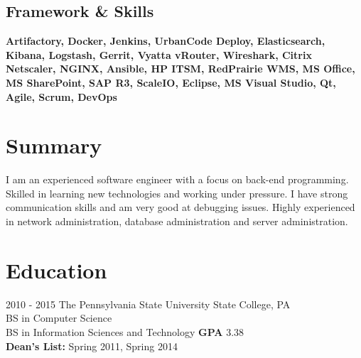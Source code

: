 \documentclass[]{friggeri-cv}
\begin{document}
\begin{aside}
  \section{Framework \& Skills}
    \textbf{Artifactory, Docker, Jenkins, UrbanCode Deploy, Elasticsearch, Kibana, Logstash,
    Gerrit, Vyatta vRouter, Wireshark, Citrix Netscaler, NGINX, Ansible, HP ITSM, RedPrairie WMS,
    MS Office, MS SharePoint, SAP R3, ScaleIO, Eclipse, MS Visual Studio, Qt, Agile, Scrum, DevOps}
\end{aside}

\section{Summary}
  {I am an experienced software engineer with a focus on back-end programming. Skilled in learning new
  technologies and working under pressure. I have strong communication skills and am very good at
  debugging issues. Highly experienced in network administration, database administration and server
  administration.\\}

\section{Education}
\begin{entrylist}
  \entry
    {2010 - 2015}
    {The Pennsylvania State University \hfill \hfill State College, PA}
    {\\BS in Computer Science \\BS in Information Sciences and Technology}
    {\textbf{GPA} 3.38\\
    \textbf{Dean's List:} Spring 2011, Spring 2014\\}

\end{entrylist}
\end{document}
